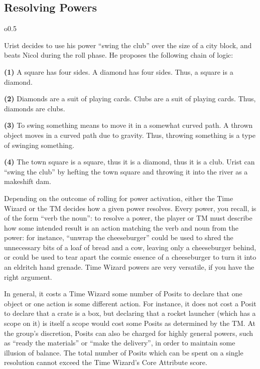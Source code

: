 \documentclass[twoside]{article}
\newenvironment{examplebox}[1]{\begin{tcolorbox}[colback=green!5!white,colframe=green!75!black,title={Example: #1}]}{\end{tcolorbox}\vspace{-30pt}}
\begin{document}
\subsection{Resolving Powers} \label{ssec:resolve-power}
\begin{wrapfigure}{o}{0.5\textwidth}
   \vspace{-10pt}
   \begin{examplebox}{Power Resolution}
      Urist decides to use his power ``swing the club'' over the size of a city block, and beats
      Nicol during the roll phase. He proposes the following chain of logic:

      \textbf{(1)}
         A square has four sides. A diamond has four sides. Thus, a square is a diamond.
      
      \textbf{(2)}
         Diamonds are a suit of playing cards. Clubs are a suit of playing cards. Thus, diamonds 
         are clubs.
      
      \textbf{(3)}
         To swing something means to move it in a somewhat curved path. A thrown object moves in 
         a curved path due to gravity. Thus, throwing something is a type of swinging something.

      \textbf{(4)}
         The town square is a square, thus it is a diamond, thus it is a club. Urist can
         ``swing the club'' by hefting the town square and throwing it into the river as a
         makeshift dam.
   \end{examplebox}
   \vspace{20pt}
\end{wrapfigure}

Depending on the outcome of rolling for power activation, either the Time Wizard or the TM
decides how a given power resolves. Every power, you recall, is of the form ``verb the noun'':
to resolve a power, the player or TM must describe how some intended result is an action
matching the verb and noun from the power: for instance, ``unwrap the cheeseburger'' could be
used to shred the unnecessary bits of a loaf of bread and a cow, leaving only a cheeseburger
behind, or could be used to tear apart the cosmic essence of a cheeseburger to turn it into
an eldritch hand grenade. Time Wizard powers are very versatile, if you have the right argument.

In general, it costs a Time Wizard some number of Posits to declare that one object or one
action is some different action. For instance, it does not cost a Posit to declare that a crate
is a box, but declaring that a rocket launcher (which has a scope on it) is itself a scope would
cost some Posits as determined by the TM. At the group's discretion, Posits can also be charged
for highly general powers, such as ``ready the materials'' or ``make the delivery'', in order to
maintain some illusion of balance. The total number of Posits which can be spent on a single
resolution cannot exceed the Time Wizard's Core Attribute score.
\end{document}
